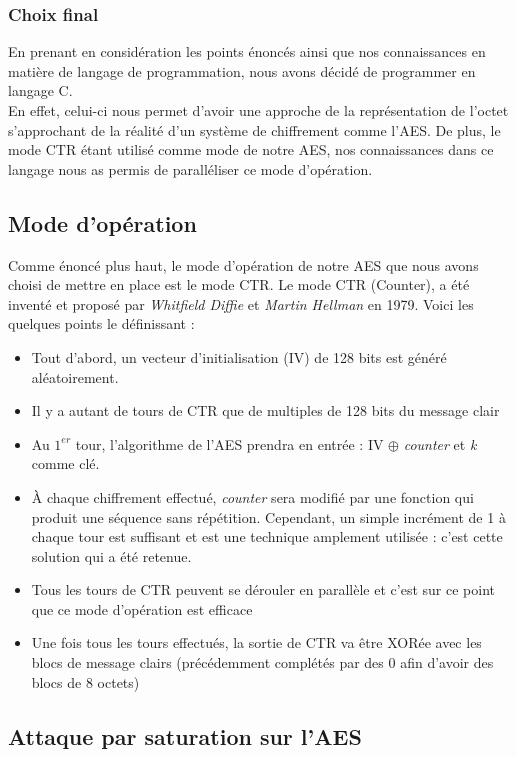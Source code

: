 \subsubsection{Choix final}  
En prenant en considération les points énoncés ainsi que nos connaissances en matière de langage de programmation, nous avons décidé de programmer en langage C. 
\\
En effet, celui-ci nous permet d'avoir une approche de la représentation de l'octet s'approchant de la réalité d'un système de chiffrement comme l'AES. De plus, le mode CTR étant utilisé comme mode de notre AES, nos connaissances dans ce langage nous as permis de paralléliser ce mode d'opération.

\subsection{Mode d'opération}
Comme énoncé plus haut, le mode d'opération de notre AES que nous avons choisi de mettre en place est le mode CTR. 
\newline
Le mode CTR (Counter), a été inventé et proposé par \textit{Whitfield Diffie} et \textit{Martin Hellman} en 1979. Voici les quelques points le définissant :
\begin{itemize}
	\item Tout d'abord, un vecteur d'initialisation (IV) de 128 bits est généré aléatoirement.
	\item Il y a autant de tours de CTR que de multiples de 128 bits du message clair
	\item Au $1^{er}$ tour, l'algorithme de l'AES prendra en entrée : IV $\oplus$ \textit{counter} et \textit{k} comme clé.
	\item À chaque chiffrement effectué, \textit{counter} sera modifié par une fonction qui produit une séquence sans répétition. Cependant, un simple incrément de 1 à chaque tour est suffisant et est une technique amplement utilisée : c'est cette solution qui a été retenue.
	\item Tous les tours de CTR peuvent se dérouler en parallèle et c'est sur ce point que ce mode d'opération est efficace
	\item Une fois tous les tours effectués, la sortie de CTR va être XORée avec les blocs de message clairs (précédemment complétés par des 0 afin d'avoir des blocs de 8 octets) 
\end{itemize}

\subsection{Attaque par saturation sur l'AES}

